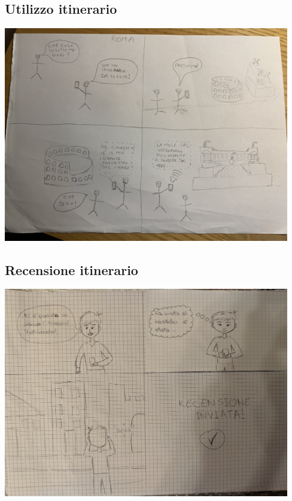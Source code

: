 \centering \subsection{Utilizzo itinerario}

\begin{center}
    \includegraphics[width=12.5cm]{../storyboards/Utilizzo.jpg}
\end{center}

\centering \subsection{Recensione itinerario}

\begin{center}
    \includegraphics[width=12.5cm]{../storyboards/Recensione.jpg}
\end{center}
